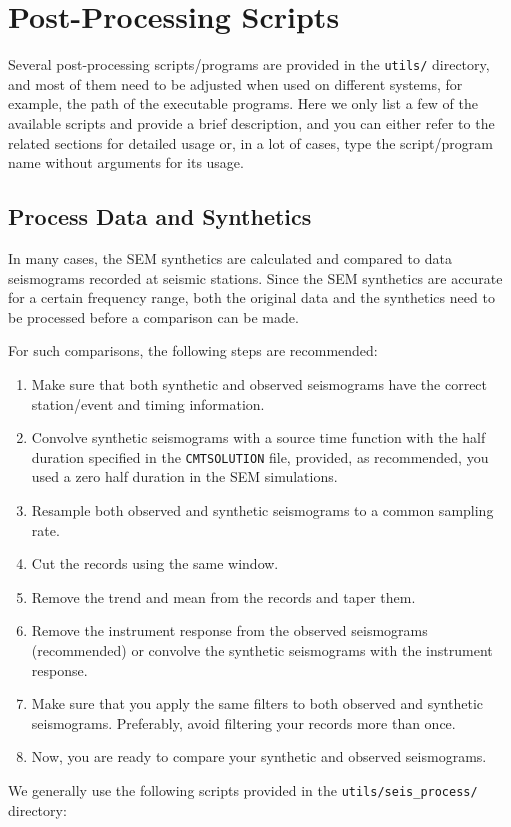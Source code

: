 \chapter{Post-Processing Scripts}

Several post-processing scripts/programs are provided in the \texttt{utils/}
directory, and most of them need to be adjusted when used on different
systems, for example, the path of the executable programs. Here we
only list a few of the available scripts and provide a brief description,
and you can either refer to the related sections for detailed usage
or, in a lot of cases, type the script/program name without arguments
for its usage.


\section{Process Data and Synthetics}\label{sec:Process-data-and-syn}

In many cases, the SEM synthetics are calculated and compared to data
seismograms recorded at seismic stations. Since the SEM synthetics
are accurate for a certain frequency range, both the original data
and the synthetics need to be processed before a comparison can be
made.

For such comparisons, the following steps are recommended:
\begin{enumerate}
\item Make sure that both synthetic and observed seismograms have the correct
station/event and timing information.
\item Convolve synthetic seismograms with a source time function with the
half duration specified in the \texttt{CMTSOLUTION} file, provided,
as recommended, you used a zero half duration in the SEM simulations.
\item Resample both observed and synthetic seismograms to a common sampling
rate.
\item Cut the records using the same window.
\item Remove the trend and mean from the records and taper them.
\item Remove the instrument response from the observed seismograms (recommended)
or convolve the synthetic seismograms with the instrument response.
\item Make sure that you apply the same filters to both observed and synthetic
seismograms. Preferably, avoid filtering your records more than once.
\item Now, you are ready to compare your synthetic and observed seismograms.
\end{enumerate}
\noindent We generally use the following scripts provided in the \texttt{utils/seis\_process/}
directory:


